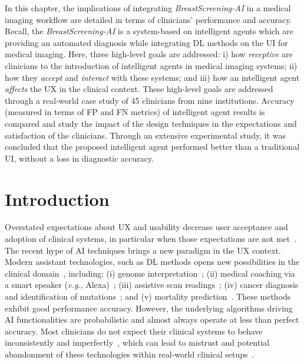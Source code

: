 \clearpage
\label{chap:chap006}

In this chapter, the implications of integrating {\it BreastScreening-AI} in a medical imaging workflow are detailed in terms of clinicians' performance and accuracy.
Recall, the {\it BreastScreening-AI} is a system-based on intelligent agents which are providing an automated diagnosis while integrating \ac{DL} methods on the \ac{UI} for medical imaging.
Here, three high-level goals are addressed:
i) how {\it receptive} are clinicians to the introduction of intelligent agents in medical imaging systems;
ii) how they {\it accept} and {\it interact} with these systems; and
iii) how an intelligent agent {\it affects} the \ac{UX} in the clinical context.
These high-level goals are addressed through a real-world case study of 45 clinicians from nine institutions.
Accuracy (measured in terms of \ac{FP} and \ac{FN} metrics) of intelligent agent results is compared and study the impact of the design techniques in the expectations and satisfaction of the clinicians.
Through an extensive experimental study, it was concluded that the proposed intelligent agent performed better than a traditional \ac{UI}, without a loss in diagnostic accuracy.

\section{Introduction}
\label{sec:sec006001}

Overstated expectations about \ac{UX} and usability decrease user acceptance and adoption of clinical systems, in particular when those expectations are not met~\cite{Inkpen:2019:HBG:3290607.3299002, Kocielnik:2019:YAI:3290605.3300641, Oh:2018:ILY:3173574.3174223}.
The recent hype of \ac{AI} techniques brings a new paradigm in the \ac{UX} context.
Modern assistant technologies, such as \ac{DL} methods opens new possibilities in the clinical domain~\cite{topol2019high}, including:
(i) genome interpretation~\cite{sundaram2018predicting};
(ii) medical coaching via a smart speaker ({\it e.g.}, Alexa)~\cite{bickmore2018patient};
(iii) assistive scan readings~\cite{madani2018deep};
(iv) cancer diagnosis and identification of mutations~\cite{coudray2018classification}; and
(v) mortality prediction~\cite{ahmad2018death}.
These methods exhibit good performance accuracy.
However, the underlying algorithms driving \ac{AI} functionalities are probabilistic and almost always operate at less than perfect accuracy.
Most clinicians do not expect their clinical systems to behave inconsistently and imperfectly~\cite{hoff2015trust, Kocielnik:2019:YAI:3290605.3300641}, which can lead to mistrust and potential abandonment of these technologies within real-world clinical setups~\cite{benrimoh2018aifred}.

